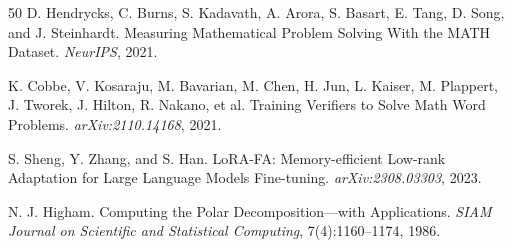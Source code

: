\documentclass[twocolumn]{article}
\begin{document}
\begin{thebibliography}{50}
D. Hendrycks, C. Burns, S. Kadavath, A. Arora, S. Basart, E. Tang, D. Song, and J. Steinhardt. Measuring Mathematical Problem Solving With the MATH Dataset. \emph{NeurIPS}, 2021.

K. Cobbe, V. Kosaraju, M. Bavarian, M. Chen, H. Jun, L. Kaiser, M. Plappert, J. Tworek, J. Hilton, R. Nakano, et al. Training Verifiers to Solve Math Word Problems. \emph{arXiv:2110.14168}, 2021.

S. Sheng, Y. Zhang, and S. Han. LoRA-FA: Memory-efficient Low-rank Adaptation for Large Language Models Fine-tuning. \emph{arXiv:2308.03303}, 2023.

N. J. Higham. Computing the Polar Decomposition---with Applications. \emph{SIAM Journal on Scientific and Statistical Computing}, 7(4):1160--1174, 1986.

\end{thebibliography}
\end{document}
